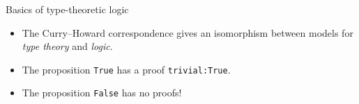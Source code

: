 \documentclass{beamer}
\begin{document}
\begin{frame}{Basics of type-theoretic logic}

  \begin{itemize}
    \item<1-> The Curry--Howard correspondence gives an isomorphism between
      models for \emph{type theory} and \emph{logic}.

      \vspace*{3mm}


      \vspace*{4mm}

    \item<3-> The proposition \texttt{True} has a proof
      \texttt{trivial:True}.
    \item<4-> The proposition \texttt{False} has no proofs!
  \end{itemize}

\end{frame}
\end{document}
